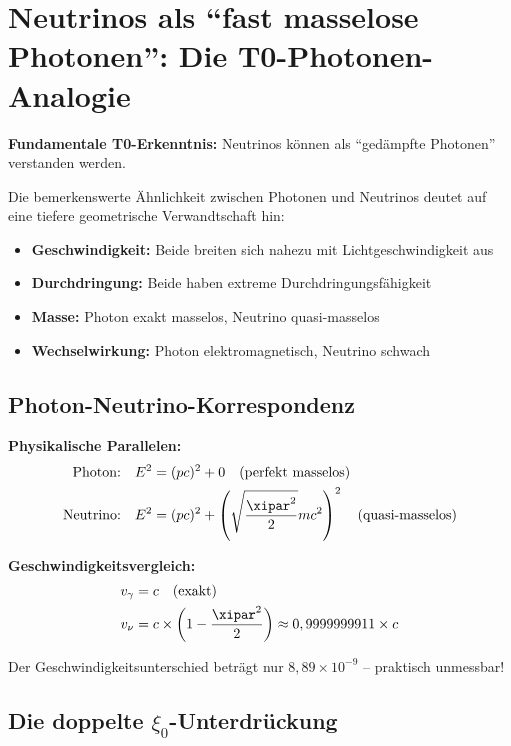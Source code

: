 	\section{Neutrinos als ``fast masselose Photonen'': Die T0-Photonen-Analogie}
	
	\begin{speculation}
		\textbf{Fundamentale T0-Erkenntnis:} Neutrinos können als ``gedämpfte Photonen'' verstanden werden.
		
		Die bemerkenswerte Ähnlichkeit zwischen Photonen und Neutrinos deutet auf eine tiefere geometrische Verwandtschaft hin:
		\begin{itemize}
			\item \textbf{Geschwindigkeit:} Beide breiten sich nahezu mit Lichtgeschwindigkeit aus
			\item \textbf{Durchdringung:} Beide haben extreme Durchdringungsfähigkeit
			\item \textbf{Masse:} Photon exakt masselos, Neutrino quasi-masselos
			\item \textbf{Wechselwirkung:} Photon elektromagnetisch, Neutrino schwach
		\end{itemize}
	\end{speculation}
	
	\subsection{Photon-Neutrino-Korrespondenz}
	
	\begin{photon}
		\textbf{Physikalische Parallelen:}
		\begin{align}
			\text{Photon:} \quad &E^2 = (pc)^2 + 0 \quad \text{(perfekt masselos)} \\
			\text{Neutrino:} \quad &E^2 = (pc)^2 + \left(\sqrt{\frac{\xipar^2}{2}} m c^2\right)^2 \quad \text{(quasi-masselos)}
		\end{align}
		
		\textbf{Geschwindigkeitsvergleich:}
		\begin{align}
			v_\gamma &= c \quad \text{(exakt)} \\
			v_\nu &= c \times \left(1 - \frac{\xipar^2}{2}\right) \approx 0,9999999911 \times c
		\end{align}
		
		Der Geschwindigkeitsunterschied beträgt nur $8,89 \times 10^{-9}$ -- praktisch unmessbar!
	\end{photon}
	
	\subsection{Die doppelte $\xi_0$-Unterdrückung}
	
